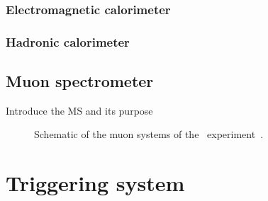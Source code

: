 \FloatBarrier
\subsubsection{Electromagnetic calorimeter} 
\label{sec:ecal}

\FloatBarrier
\subsubsection{Hadronic calorimeter} 
\label{sec:hcal}

\FloatBarrier
\subsection{Muon spectrometer} 
\label{sec:ms}

{\color{red} Introduce the MS and its purpose}

\begin{figure}[ht]
  \caption{
    Schematic of the muon systems of the
    \atlas\ experiment~\cite{Pequenao:1095929}.
  }
  \label{fig:ms_cartoon}
\end{figure}


\FloatBarrier
\section{Triggering system}

